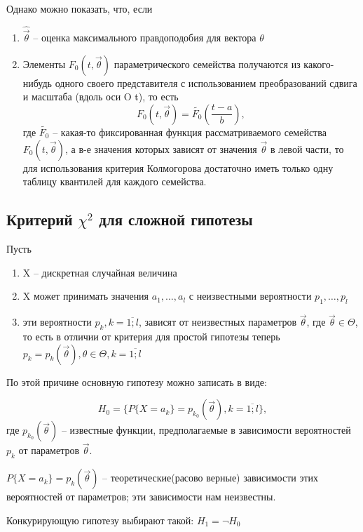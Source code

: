 \documentclass[a4paper, 12pt]{article}
\theoremstyle{definition}
\theoremstyle{leads}
\theoremstyle{example}
\theoremstyle{remark}
\begin{document}
Однако можно показать, что, если 

\begin{enumerate}
	\item  $\hat{\vec{\theta}}$ -- оценка максимального правдоподобия для вектора $\theta$
	\item Элементы $F_0(t, \vec{\theta})$ параметрического семейства получаются из какого-нибудь одного своего представителя с использованием преобразований сдвига и масштаба (вдоль оси O t), то есть 
	\begin{equation*}
		F_0(t, \vec{\theta}) = \tilde{F_0}(\frac{t - a}{b}),
	\end{equation*}
	где  $\tilde{F_0}$ -- какая-то фиксированная функция рассматриваемого семейства $F_0(t, \vec{\theta})$, а в-е значения которых зависят от значения $\vec{\theta}$  в левой части, то для использования критерия Колмогорова достаточно иметь только  одну таблицу квантилей для каждого семейства.
\end{enumerate}

\subsection{Критерий $\chi^2$ для сложной гипотезы}
Пусть 
\begin{enumerate}
	\item X -- дискретная случайная величина
	\item X может принимать значения $a_1, \dots, a_l$ с неизвестными вероятности $p_1, \dots, p_l$
	\item эти вероятности $p_k, k = \overline{1; l}$, зависят от неизвестных параметров $\vec{\theta}$, где $\vec{\theta} \in \Theta$, то есть в отличии от критерия для простой гипотезы теперь $p_k = p_k(\vec{\theta}), \theta \in \Theta, k = \overline{1; l}$ 
\end{enumerate}

По этой причине основную гипотезу можно записать в виде:

\begin{equation}
	H_0 = \{P\{X = a_k\} = p_{k_0}(\vec{\theta}), k = \overline{1; l}\}, 
\end{equation}
где $p_{k_0}(\vec{\theta})$ -- известные функции, предполагаемые в зависимости вероятностей $p_k$ от параметров $\vec{\theta}$.

$P\{X = a_k\} = p_k(\vec{\theta})$ -- теоретические(расово верные) зависимости этих вероятностей от параметров; эти зависимости нам неизвестны.

Конкурирующую гипотезу выбирают такой: $H_1 = \neg H_0$
\end{document}
